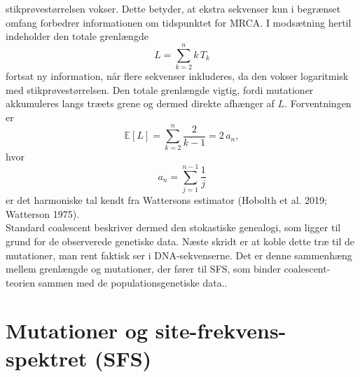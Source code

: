 \documentclass[
  10pt,
  a4paper,
]{scrbook}
\begin{document}
stikprøvestørrelsen vokser. Dette betyder, at ekstra sekvenser kun i
begrænset omfang forbedrer informationen om tidspunktet for MRCA. I
modsætning hertil indeholder den totale grenlængde \[
L = \sum_{k=2}^{n} k\,T_k
\] fortsat ny information, når flere sekvenser inkluderes, da den vokser
logaritmisk med stikprøvestørrelsen. Den totale grenlængde vigtig, fordi
mutationer akkumuleres langs træets grene og dermed direkte afhænger af
\(L\). Forventningen er \[
\mathbb{E}[L] = \sum_{k=2}^{n} \frac{2}{k-1} = 2\,a_n,
\] hvor \[
a_n=\sum_{j=1}^{n-1} \frac{1}{j}
\] er det harmoniske tal kendt fra Wattersons estimator (Hobolth et al.
2019; Watterson 1975).\\
Standard coalescent beskriver dermed den stokastiske genealogi, som
ligger til grund for de observerede genetiske data. Næste skridt er at
koble dette træ til de mutationer, man rent faktisk ser i
DNA-sekvenserne. Det er denne sammenhæng mellem grenlængde og
mutationer, der fører til SFS, som binder coalescent-teorien sammen med
de populationsgenetiske data..

\section{Mutationer og site-frekvens-spektret
(SFS)}\label{mutationer-og-site-frekvens-spektret-sfs}
\end{document}

